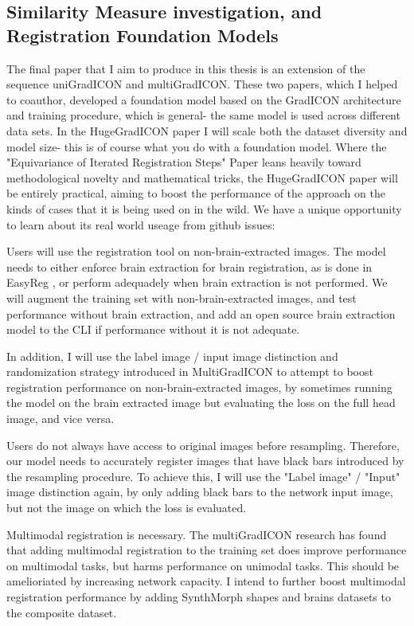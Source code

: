 \documentclass{article}
\begin{document}
\subsection{Similarity Measure investigation, and Registration Foundation Models}

The final paper that I aim to produce in this thesis is an extension of the sequence uniGradICON and multiGradICON. These two papers, which I helped to coauthor, developed a foundation model based on the GradICON architecture and training procedure, which is general- the same model is used across different data sets. In the HugeGradICON paper I will scale both the dataset diversity and model size- this is of course what you do with a foundation model. Where the "Equivariance of Iterated Registration Steps" Paper leans heavily toward methodological novelty and mathematical tricks, the HugeGradICON paper will be entirely practical, aiming to boost the performance of the approach on the kinds of cases that it is being used on in the wild. We have a unique opportunity to learn about its real world useage from github issues:

Users will use the registration tool on non-brain-extracted images. The model needs to either enforce brain extraction for brain registration, as is done in EasyReg \cite{easyReg}, or perform adequadely when brain extraction is not performed. We will augment the training set with non-brain-extracted images, and test performance without brain extraction, and add an open source brain extraction model to the CLI if performance without it is not adequate.

In addition, I will use the label image / input image distinction and randomization strategy introduced in MultiGradICON to attempt to boost registration performance on non-brain-extracted images, by sometimes running the model on the brain extracted image but evaluating the loss on the full head image, and vice versa.

Users do not always have access to original images before resampling. Therefore, our model needs to accurately register images that have black bars introduced by the resampling procedure. To achieve this, I will use the "Label image" / "Input" image distinction again, by only adding black bars to the network input image, but not the image on which the loss is evaluated.

Multimodal registration is necessary. The multiGradICON research has found that adding multimodal registration to the training set does improve performance on multimodal tasks, but harms performance on unimodal tasks. This should be amelioriated by increasing network capacity. I intend to further boost multimodal registration performance by adding SynthMorph shapes and brains datasets to the composite dataset.
\end{document}
